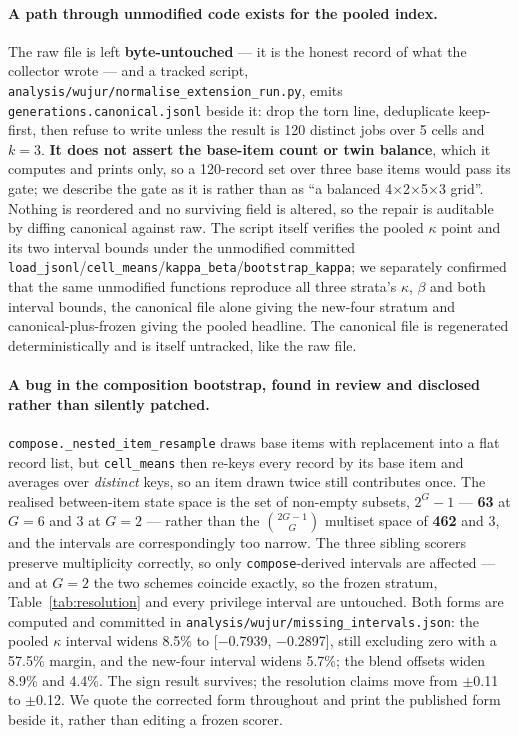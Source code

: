 \documentclass{article}
\providecommand{\textminus}{\ensuremath{-}}
\begin{document}
\paragraph{A path through unmodified code exists for the pooled index.} The raw file
  is left \textbf{byte-untouched} --- it is the honest record of what the
  collector wrote --- and a tracked script,
  \texttt{analysis/\allowbreak wujur/\allowbreak normalise\_\allowbreak extension\_\allowbreak run.py}, emits
  \texttt{generations.canonical.jsonl} beside it: drop the torn line, deduplicate
  keep-first, then refuse to write unless the result is 120 distinct jobs over 5
  cells and $k=3$. \textbf{It does not assert the base-item count or twin
  balance}, which it computes and prints only, so a 120-record set over three
  base items would pass its gate; we describe the gate as it is rather than as
  ``a balanced 4$\times$2$\times$5$\times$3 grid''. Nothing is reordered and no
  surviving field is altered, so the repair is auditable by diffing canonical
  against raw. The script itself verifies the pooled $\kappa$ point and its two
  interval bounds under the unmodified committed
  \texttt{load\_jsonl}/\texttt{cell\_means}/\texttt{kappa\_beta}/\texttt{bootstrap\_kappa};
  we separately confirmed that the same unmodified functions reproduce all three
  strata's $\kappa$, $\beta$ and both interval bounds, the canonical file alone
  giving the new-four stratum and canonical-plus-frozen giving the pooled
  headline. The canonical file is regenerated deterministically and is itself
  untracked, like the raw file.

\paragraph{A bug in the composition bootstrap, found in review and disclosed
  rather than silently patched.} \texttt{compose.\_\allowbreak nested\_\allowbreak item\_\allowbreak resample}
  draws base items with replacement into a flat record list, but
  \texttt{cell\_means} then re-keys every record by its base item and averages
  over \emph{distinct} keys, so an item drawn twice still contributes once. The
  realised between-item state space is the set of non-empty subsets, $2^G-1$ ---
  \textbf{63} at $G=6$ and 3 at $G=2$ --- rather than the $\binom{2G-1}{G}$
  multiset space of \textbf{462} and 3, and the intervals are correspondingly
  too narrow. The
  three sibling scorers preserve multiplicity correctly, so only
  \texttt{compose}-derived intervals are affected --- and at $G=2$ the two
  schemes coincide exactly, so the frozen stratum, Table~\ref{tab:resolution}
  and every privilege interval are untouched. Both forms are computed and
  committed in \texttt{analysis/\allowbreak wujur/\allowbreak missing\_\allowbreak intervals.json}: the pooled
  $\kappa$ interval widens 8.5\% to [\textminus 0.7939, \textminus 0.2897], still excluding
  zero with a 57.5\% margin, and the new-four interval widens 5.7\%; the
  blend offsets widen 8.9\% and 4.4\%. The sign result survives;
  the resolution claims move from $\pm$0.11 to $\pm$0.12. We quote the
  corrected form throughout and print the published form beside it, rather than
  editing a frozen scorer.
\end{document}

